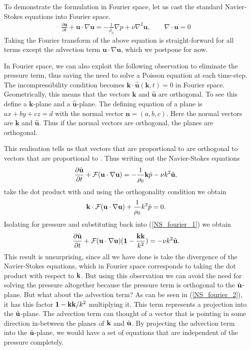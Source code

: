 To demonstrate the formulation in Fourier space, let us cast the standard Navier-Stokes equations into Fourier space. 
\begin{align}
\frac{\partial \textbf{u}}{\partial t} + \textbf{u}\cdot\nabla\textbf{u} = -\frac{1}{\rho_{0}}\nabla p + \nu\nabla^{2}\textbf{u}, \qquad \nabla\cdot\textbf{u}=0
\end{align}
Taking the Fourier transform of the above equation is straight-forward for all terms except the advection term $\textbf{u}\cdot\nabla\textbf{u}$, which we postpone for now.

In Fourier space, we can also exploit the following observation to eliminate the pressure term, thus saving the need to solve a Poisson equation at each time-step. The incompressibility condition becomes $\textbf{k}\cdot\hat{\textbf{u}}(\textbf{k},t)=0$ in Fourier space. Geometrically, this means that the vectors $\textbf{k}$ and $\hat{\textbf{u}}$ are orthogonal. To see this define a $\textbf{k}$-plane and a $\hat{\textbf{u}}$-plane. The defining equation of a plane is $ax+by+cz=d$ with the normal vector $\textbf{n}=(a,b,c)$. Here the normal vectors are $\textbf{k}$ and $\hat{\textbf{u}}$. Thus if the normal vectors are orthogonal, the planes are orthogonal.

This realisation tells us that vectors that are proportional to \uhatm are orthogonal to vectors that are proportional to \kvecm. Thus writing out the Navier-Stokes equations
\begin{align}
\frac{\partial \hat{\textbf{u}}}{\partial t} + \mathcal{F}(\textbf{u}\cdot\nabla\textbf{u}) = -\frac{1}{\rho_{0}} \textbf{k}\hat{p} - \nu k^{2}\hat{\textbf{u}}\label{NS_fourier_1},
\end{align}
take the dot product with \kvecm and using the orthogonality condition we obtain
\begin{align}
\textbf{k}\cdot\mathcal{F}(\textbf{u}\cdot\nabla\textbf{u}) + \frac{1}{\rho_{0}}k^{2}\hat{p}=0\label{pressure_fourier_1}.
\end{align}
Isolating for pressure and substituting back into (\ref{NS_fourier_1}) we obtain
\begin{align}
\frac{\partial \hat{\textbf{u}}}{\partial t} + \mathcal{F}(\textbf{u}\cdot\nabla\textbf{u})(\textbf{1}-\frac{\textbf{k}\textbf{k}}{k^{2}})= - \nu k^{2}\hat{\textbf{u}}\label{NS_fourier_2}.
\end{align}
This result is unsurprising, since all we have done is take the divergence of the Navier-Stokes equations, which in Fourier space corresponds to taking the dot product with respect to $\textbf{k}$. But using this observation we can avoid the need for solving the pressure altogether because the pressure term is orthogonal to the $\hat{\textbf{u}}$-plane. But what about the advection term? As can be seen in (\ref{NS_fourier_2}), it has this factor $\textbf{1} - \textbf{k}\textbf{k}/k^{2}$ multiplying it. This term represents a projection into the $\hat{\textbf{u}}$-plane. The advection term can thought of a vector that is pointing in some direction in-between the planes of $\textbf{k}$ and $\hat{\textbf{u}}$. By projecting the advection term into the $\hat{\textbf{u}}$-plane, we would have a set of equations that are independent of the pressure completely.

